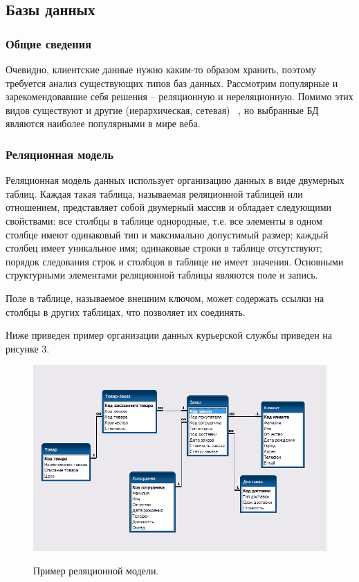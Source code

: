 \documentclass[a4paper,14pt]{extarticle}
\begin{document}
 	\subsection{Базы данных}
 	
 	\subsubsection{Общие сведения}
 	
 	Очевидно, клиентские данные нужно каким-то образом хранить, поэтому требуется анализ существующих типов баз данных. Рассмотрим популярные и зарекомендовавшие себя решения – реляционную и нереляционную. Помимо этих видов существуют и другие (иерархическая, сетевая) ~\cite{bd}, но выбранные БД являются наиболее популярными в мире веба.
 	
 	\subsubsection{Реляционная модель}
 	
 	Реляционная модель данных использует организацию данных в виде двумерных таблиц. Каждая такая таблица, называемая реляционной таблицей или отношением, представляет собой двумерный массив и обладает следующими свойствами: все столбцы в таблице однородные, т.е. все элементы в одном столбце имеют одинаковый тип и максимально допустимый размер; каждый столбец имеет уникальное имя; одинаковые строки в таблице отсутствуют; порядок следования строк и столбцов в таблице не имеет значения. Основными структурными элементами реляционной таблицы являются поле и запись.
 	
 	Поле в таблице, называемое внешним ключом, может содержать ссылки на столбцы в других таблицах, что позволяет их соединять.
 	
 	Ниже приведен пример организации данных курьерской службы приведен на рисунке 3.
 	
 	\newpage
 	
 	\begin{figure}[h!]
 		\begin{center}
 			{\includegraphics[scale = 0.6]{img/deliver.png}}
 			\label{ris:deliver}
 		\end{center}
 		\caption{Пример реляционной модели.}
 	\end{figure}
	
\end{document}
